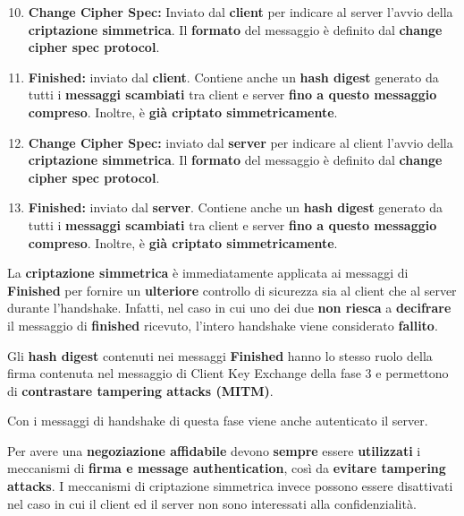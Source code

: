 \begin{definition}
\begin{enumerate}\setcounter{enumi}{9}
    \item \textbf{Change Cipher Spec:} Inviato dal \textbf{client} per indicare al server l'avvio della \textbf{criptazione simmetrica}. Il \textbf{formato} del messaggio è definito dal \textbf{change cipher spec protocol}.
    \item \textbf{Finished:} inviato dal \textbf{client}. Contiene anche un \textbf{hash digest} generato da tutti i \textbf{messaggi scambiati} tra client e server \textbf{fino a questo messaggio compreso}. Inoltre, è \textbf{già criptato simmetricamente}.
    \item \textbf{Change Cipher Spec:} inviato dal \textbf{server} per indicare al client l'avvio della \textbf{criptazione simmetrica}. Il \textbf{formato} del messaggio è definito dal \textbf{change cipher spec protocol}.
    \item \textbf{Finished:} inviato dal \textbf{server}. Contiene anche un \textbf{hash digest} generato da tutti i \textbf{messaggi scambiati} tra client e server \textbf{fino a questo messaggio compreso}. Inoltre, è \textbf{già criptato simmetricamente}.
\end{enumerate}
\end{definition}
\begin{remark}
La \textbf{criptazione simmetrica} è immediatamente applicata ai messaggi di \textbf{Finished} per fornire un \textbf{ulteriore} controllo di sicurezza sia al client che al server durante l'handshake. Infatti, nel caso in cui uno dei due \textbf{non riesca} a \textbf{decifrare} il messaggio di \textbf{finished} ricevuto, l'intero handshake viene considerato \textbf{fallito}.
\end{remark}
\begin{remark}
Gli \textbf{hash digest} contenuti nei messaggi \textbf{Finished} hanno lo stesso ruolo della firma contenuta nel messaggio di Client Key Exchange della fase 3 e permettono di \textbf{contrastare tampering attacks (MITM)}.
\end{remark}
\begin{remark}
Con i messaggi di handshake di questa fase viene anche autenticato il server.
\end{remark}
\begin{remark}
Per avere una \textbf{negoziazione affidabile} devono \textbf{sempre} essere \textbf{utilizzati} i meccanismi di \textbf{firma e message authentication}, così da \textbf{evitare tampering attacks}. I meccanismi di criptazione simmetrica invece possono essere disattivati nel caso in cui il client ed il server non sono interessati alla confidenzialità.
\end{remark}\pagebreak
